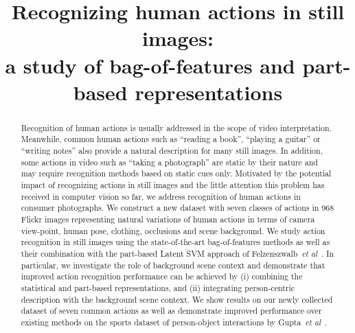 \documentclass{bmvc2k}
\title{Recognizing human actions in still images: \\ a study of bag-of-features and part-based representations}
\def\etal{\emph{et al}\bmvaOneDot}
\begin{document}
\maketitle

\begin{abstract}
Recognition of human actions is usually addressed in the scope of video
interpretation.
Meanwhile, common human actions such as ``reading a book'', ``playing a guitar''
or ``writing notes'' also provide a natural description for many still images.
In addition, some actions in video such as ``taking a photograph'' are static by their
nature and may require recognition methods based on static cues only.
Motivated by the potential impact of recognizing actions in still images
and the little attention this problem has received in computer vision
so far, we address recognition of human actions in
consumer photographs.
We construct a new dataset with seven classes of actions in 968 Flickr images
representing natural variations
of human actions in terms of camera view-point, human pose, clothing, occlusions and scene background.
We study action recognition in still images using the state-of-the-art bag-of-features methods as well
as their combination with the part-based Latent SVM approach of Felzenszwalb~\etal~\cite{Felzenszwalb09}.
In particular, we investigate the role of background scene context and demonstrate
that improved action recognition performance can be achieved by
 (i) combining the statistical and part-based representations,
 and (ii) integrating person-centric description with the background scene context. 
We show results on our newly collected dataset of seven common actions
as well as  demonstrate improved performance over existing methods on the sports dataset of person-object interactions by Gupta~\etal~\cite{Gupta09}.


\end{abstract}
\end{document}
